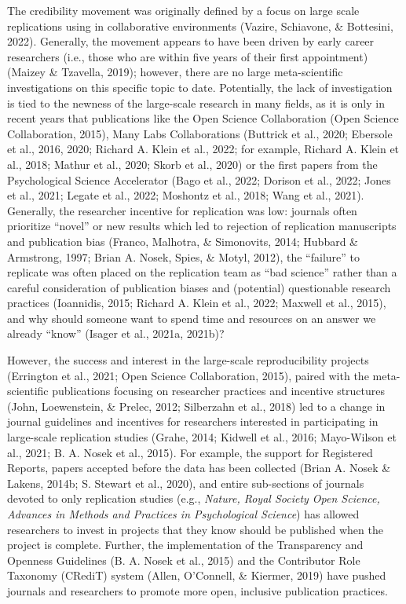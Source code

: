 \documentclass[
  man,floatsintext]{apa6}
\begin{document}
The credibility movement was originally defined by a focus on large
scale replications using in collaborative environments (Vazire, Schiavone, \& Bottesini, 2022).
Generally, the movement appears to have been driven by early career researchers
(i.e., those who are within five years of their first appointment)
(Maizey \& Tzavella, 2019); however, there are no large meta-scientific
investigations on this specific topic to date. Potentially, the lack of
investigation is tied to the newness of the large-scale research in many
fields, as it is only in recent years that publications like the Open
Science Collaboration (Open Science Collaboration, 2015), Many Labs
Collaborations (Buttrick et al., 2020; Ebersole et al., 2016, 2020; Richard A. Klein et al., 2022; for example, Richard A. Klein et al., 2018; Mathur et al., 2020; Skorb et al., 2020) or the first papers
from the Psychological Science Accelerator (Bago et al., 2022; Dorison et al., 2022; Jones et al., 2021; Legate et al., 2022; Moshontz et al., 2018; Wang et al., 2021). Generally, the
researcher incentive for replication was low: journals often prioritize
``novel'' or new results which led to rejection of replication manuscripts
and publication bias (Franco, Malhotra, \& Simonovits, 2014; Hubbard \& Armstrong, 1997; Brian A. Nosek, Spies, \& Motyl, 2012), the
``failure'' to replicate was often placed on the replication team as ``bad
science'' rather than a careful consideration of publication biases and
(potential) questionable research practices (Ioannidis, 2015; Richard A. Klein et al., 2022; Maxwell et al., 2015), and why should someone want to spend time and
resources on an answer we already ``know'' (Isager et al., 2021a, 2021b)?

However, the success and interest in the large-scale reproducibility
projects (Errington et al., 2021; Open Science Collaboration, 2015), paired
with the meta-scientific publications focusing on researcher practices
and incentive structures (John, Loewenstein, \& Prelec, 2012; Silberzahn et al., 2018) led to a
change in journal guidelines and incentives for researchers interested
in participating in large-scale replication studies (Grahe, 2014; Kidwell et al., 2016; Mayo-Wilson et al., 2021; B. A. Nosek et al., 2015). For example, the support
for Registered Reports, papers accepted before the data has been
collected (Brian A. Nosek \& Lakens, 2014b; S. Stewart et al., 2020), and entire sub-sections of
journals devoted to only replication studies (e.g., \emph{Nature, Royal Society Open Science, Advances in Methods and Practices in Psychological Science}) has allowed researchers to invest in projects that they know
should be published when the project is complete. Further, the
implementation of the Transparency and Openness Guidelines (B. A. Nosek et al., 2015)
and the Contributor Role Taxonomy (CRediT) system (Allen, O'Connell, \& Kiermer, 2019) have
pushed journals and researchers to promote more open, inclusive
publication practices.
\end{document}
